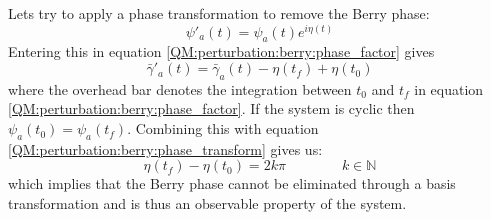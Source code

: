         Lets try to apply a phase transformation to remove the Berry phase:
        \begin{equation}
        	\label{QM:perturbation:berry:phase_transform}
        	\psi'_a(t) = \psi_a(t)e^{i\eta(t)}
        \end{equation}
        Entering this in equation \ref{QM:perturbation:berry:phase_factor} gives
        \begin{equation}
        	\bar\gamma'_a(t) = \bar\gamma_a(t) - \eta(t_f) + \eta(t_0)
        \end{equation}
        where the overhead bar denotes the integration between $t_0$ and $t_f$ in equation \ref{QM:perturbation:berry:phase_factor}. If the system is cyclic then $\psi_a(t_0) = \psi_a(t_f)$. Combining this with equation \ref{QM:perturbation:berry:phase_transform} gives us:
        \begin{equation}
        	\eta(t_f) - \eta(t_0) = 2k\pi\qquad\qquad k\in\mathbb{N}
        \end{equation}
        which implies that the Berry phase cannot be eliminated through a basis transformation and is thus an observable property of the system.
        
